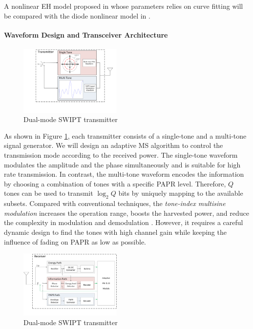 \documentclass[conference]{IEEEtran}
\begin{document}
A nonlinear EH model proposed in \cite{Boshkovska2015} whose parameters relies on curve fitting will be compared with the diode nonlinear model in \cite{Clerckx2016}.

\paragraph{Waveform Design and Transceiver Architecture}

\begin{figure}
  \centering
    \includegraphics[width=0.45\textwidth]{transmitter}
  \caption{Dual-mode SWIPT transmitter \cite{Park2018}}
  \label{fig:transmitter}
\end{figure}

As shown in Figure \ref{fig:transmitter}, each transmitter consists of a single-tone and a multi-tone signal generator. We will design an adaptive MS algorithm to control the transmission mode according to the received power. The single-tone waveform modulates the amplitude and the phase simultaneously and is suitable for high rate transmission. In contrast, the multi-tone waveform encodes the information by choosing a combination of tones with a specific PAPR level. Therefore, $Q$ tones can be used to transmit ${\log _2}Q$ bits by uniquely mapping to the available subsets. Compared with conventional techniques, the \textit{tone-index multisine modulation} increases the operation range, boosts the harvested power, and reduce the complexity in modulation and demodulation \cite{Krikidis2019}. However, it requires a careful dynamic design to find the tones with high channel gain while keeping the influence of fading on PAPR as low as possible.

\begin{figure}
  \centering
    \includegraphics[width=0.45\textwidth]{receiver}
  \caption{Dual-mode SWIPT transmitter \cite{Park2018}}
  \label{fig:receiver}
\end{figure}
\end{document}
